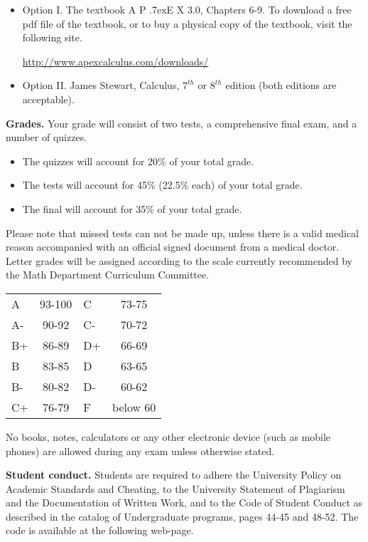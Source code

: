 \documentclass{article}
\newcommand{\apex}{A\kern -1pt \lower -2pt\hbox{P}\kern -4pt \lower .7ex\hbox{E}\kern -1pt X}
\begin{document}
\begin{itemize}
\item Option I. The textbook \apex{} 3.0, Chapters 6-9. To download a free pdf file of the textbook, or to buy a physical copy of the textbook, visit the following site.

\url{http://www.apexcalculus.com/downloads/} 
\item Option II. James Stewart, Calculus, $7^{th}$ or $8^{th}$ edition (both editions are acceptable).
\end{itemize}



\medskip
\noindent \textbf{Grades.} Your grade will consist of two tests, a comprehensive final exam, and a number of quizzes. 
\begin{itemize}
\item The quizzes will account for 20\% of your total grade.
\item The tests will account for 45\% (22.5\% each) of your total grade.
\item The final will account for 35\% of your total grade.
\end{itemize}
Please note that missed tests can not be made up, unless there is a valid medical reason accompanied with an official signed document from a medical doctor. Letter grades will be assigned according to the scale currently recommended by the Math Department Curriculum Committee. 

\begin{center}
\begin{tabular}{lc|lc}
A & 93-100 & C  & 73-75 \\
A-& 90-92  & C- & 70-72 \\
B+& 86-89  & D+ & 66-69 \\
B & 83-85  & D  & 63-65\\
B-& 80-82  & D- & 60-62\\
C+& 76-79  & F  & below 60\\
\end{tabular}

\end{center}

No books, notes, calculators or any other electronic device (such as mobile phones) are allowed during any exam unless otherwise stated.

\medskip
\noindent \textbf{Student conduct.} Students  are required to adhere the University Policy on Academic Standards and Cheating, to the University Statement of Plagiarism and the Documentation of Written Work, and to the Code of Student Conduct as described in the catalog of Undergraduate programs, pages 44-45 and 48-52. The code is available at the following web-page.
\end{document}
